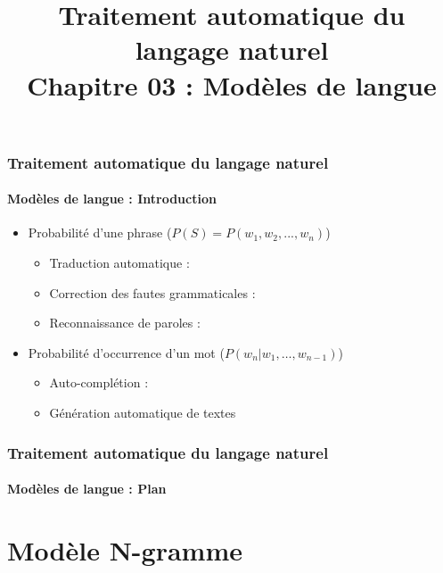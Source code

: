 \documentclass[xcolor=table]{beamer}
\title[TALN : 03- Modèles de langue]%
{Traitement automatique du langage naturel\\Chapitre 03 : Modèles de langue}
\begin{document}
	
\begin{frame}
\frametitle{Traitement automatique du langage naturel}
\framesubtitle{Modèles de langue : Introduction}

\begin{itemize}
	\item Probabilité d'une phrase ($ P(S) = P(w_1, w_2, ..., w_n) $)
	\begin{itemize}
		\item Traduction automatique : \\
		\item Correction des fautes grammaticales : \\
		\item Reconnaissance de paroles : \\
	\end{itemize}
	\item Probabilité d'occurrence d'un mot ($ P(w_n | w_1, \ldots, w_{n-1}) $)
	\begin{itemize}
		\item Auto-complétion : \\
		\item Génération automatique de textes
	\end{itemize}
\end{itemize}

\end{frame}


\begin{frame}
\frametitle{Traitement automatique du langage naturel}
\framesubtitle{Modèles de langue : Plan}

\begin{multicols}{2}
\tableofcontents
\end{multicols}
\end{frame}

\section{Modèle N-gramme}
\end{document}
